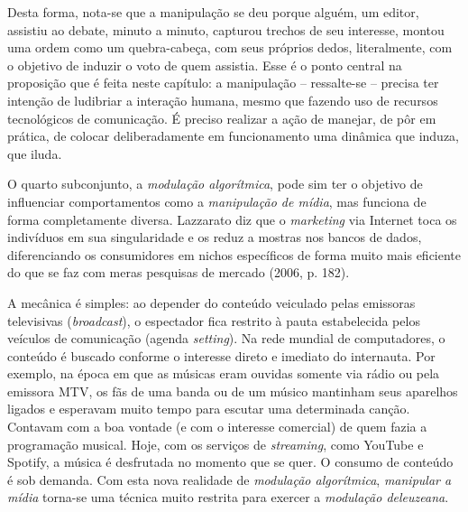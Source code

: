 Desta forma, nota-se que a manipulação se deu porque alguém, um editor,
assistiu ao debate, minuto a minuto, capturou trechos de seu interesse,
montou uma ordem como um quebra-cabeça, com seus próprios dedos,
literalmente, com o objetivo de induzir o voto de quem assistia. Esse é
o ponto central na proposição que é feita neste capítulo: a manipulação
-- ressalte-se -- precisa ter intenção de ludibriar a interação humana,
mesmo que fazendo uso de recursos tecnológicos de comunicação. É preciso
realizar a ação de manejar, de pôr em prática, de colocar
deliberadamente em funcionamento uma dinâmica que induza, que iluda.

O quarto subconjunto, a \emph{modulação algorítmica}, pode sim ter o
objetivo de influenciar comportamentos como a \emph{manipulação de
mídia}, mas funciona de forma completamente diversa. Lazzarato diz que o
\emph{marketing} via Internet toca os indivíduos em sua singularidade e
os reduz a mostras nos bancos de dados, diferenciando os consumidores em
nichos específicos de forma muito mais eficiente do que se faz com meras
pesquisas de mercado (2006, p. 182).

A mecânica é simples: ao depender do conteúdo veiculado pelas emissoras
televisivas (\emph{broadcast}), o espectador fica restrito à pauta
estabelecida pelos veículos de comunicação (agenda \emph{setting}). Na
rede mundial de computadores, o conteúdo é buscado conforme o interesse
direto e imediato do internauta. Por exemplo, na época em que as músicas
eram ouvidas somente via rádio ou pela emissora MTV, os fãs de uma banda
ou de um músico mantinham seus aparelhos ligados e esperavam muito tempo
para escutar uma determinada canção. Contavam com a boa vontade (e com o
interesse comercial) de quem fazia a programação musical. Hoje, com os
serviços de \emph{streaming}, como YouTube e Spotify, a música é
desfrutada no momento que se quer. O consumo de conteúdo é sob demanda.
Com esta nova realidade de \emph{modulação algorítmica}, \emph{manipular
a mídia} torna-se uma técnica muito restrita para exercer a
\emph{modulação deleuzeana}.

